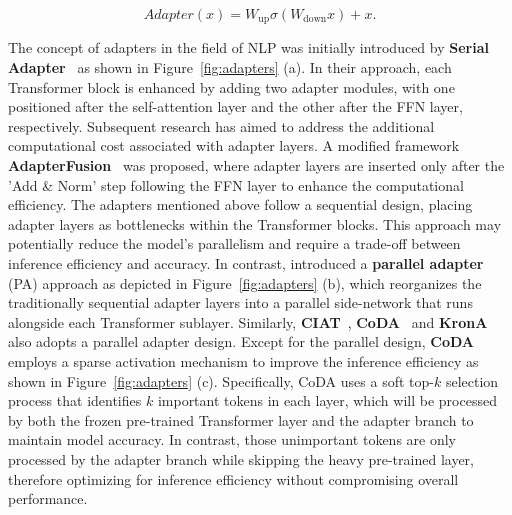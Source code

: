 \vspace{-0.19in}
\begin{equation}
Adapter(x) =  W_{\text{up}}\sigma(W_{\text{down}}x) + x.
\end{equation}

The concept of adapters in the field of NLP was initially introduced by \textbf{Serial Adapter}~\cite{9-peft-transfer-learning} as shown in Figure~\ref{fig:adapters} (a). In their approach, each Transformer block is enhanced by adding two adapter modules, with one positioned after the self-attention layer and the other after the FFN layer, respectively. Subsequent research has aimed to address the additional computational cost associated with adapter layers. A modified framework \textbf{AdapterFusion}~\cite{4-AdapterFusion} was proposed, where adapter layers are inserted only after the 'Add \& Norm' step following the FFN layer to enhance the computational efficiency. 
The adapters mentioned above follow a sequential design, placing adapter layers as bottlenecks within the Transformer blocks. This approach may potentially reduce the model's parallelism and require a trade-off between inference efficiency and accuracy. 
In contrast, \cite{14-unified-view-transfer-peft} introduced a \textbf{parallel adapter} (PA) approach as depicted in Figure~\ref{fig:adapters} (b), which reorganizes the traditionally sequential adapter layers into a parallel side-network that runs alongside each Transformer sublayer. Similarly, \textbf{CIAT}~\cite{zhu2021counter}, \textbf{CoDA}~\cite{lei2023conditional} and \textbf{KronA}~\cite{43-krona} also adopts a parallel adapter design. Except for the parallel design, \textbf{CoDA} employs a sparse activation mechanism to improve the inference efficiency as shown in Figure~\ref{fig:adapters} (c). Specifically, CoDA uses a soft top-$k$ selection process that identifies $k$ important tokens in each layer, which will be processed by both the frozen pre-trained Transformer layer and the adapter branch to maintain model accuracy. In contrast, those unimportant tokens are only processed by the adapter branch while skipping the heavy pre-trained layer, therefore optimizing for inference efficiency without compromising overall performance.

